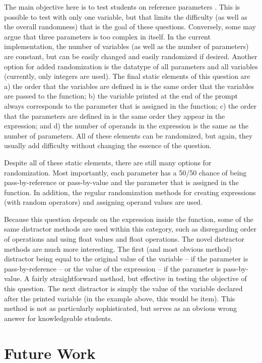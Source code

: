 \documentclass{article}
\begin{document}
The main objective here is to test students on reference parameters . This is possible to test with only one variable, but that limits the difficulty (as well as the overall randomness) that is the goal of these questions. Conversely, some may argue that three parameters is too complex in itself. In the current implementation, the number of variables (as well as the number of parameters) are constant, but can be easily changed and easily randomized if desired. Another option for added randomization is the datatype of all parameters and all variables (currently, only integers are used). The final static elements of this question are a) the order that the variables are defined in is the same order that the variables are passed to the function; b) the variable printed at the end of the prompt always corresponds to the parameter that is assigned in the function; c) the order that the parameters are defined in is the same order they appear in the expression; and d) the number of operands in the expression is the same as the number of parameters. All of these elements can be randomized, but again, they usually add difficulty without changing the essence of the question. 

Despite all of these static elements, there are still many options for randomization.  Most importantly, each parameter has a 50/50 chance of being pass-by-reference or pass-by-value and the parameter that is assigned in the function. In addition, the regular randomization methods for creating expressions (with random operators) and assigning operand values are used.

Because this question depends on the expression inside the function, some of the same distractor methods are used within this category, such as disregarding order of operations and
using float values and float operations. The novel distractor methods are much more interesting.
The first (and most obvious method) distractor being equal to the original value of the variable -- if the parameter is pass-by-reference -- or the value of the expression -- if the parameter is pass-by-value. A fairly straightforward method, but effective in testing the objective of this question. 
The next distractor is simply the value of the variable declared after the printed variable (in the example above, this would be item). This method is not as particularly sophisticated, but serves as an obvious wrong answer for knowledgeable students. 

\section{Future Work} \label{sec-future_work}
\end{document}
